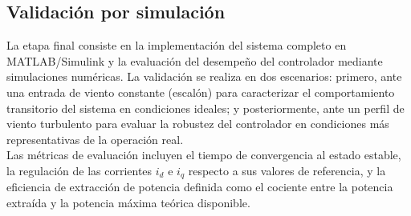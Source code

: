 \subsection{Validación por simulación}

La etapa final consiste en la implementación del sistema completo en 
MATLAB/Simulink y la evaluación del desempeño del controlador mediante 
simulaciones numéricas. La validación se realiza en dos escenarios: 
primero, ante una entrada de viento constante (escalón) para caracterizar 
el comportamiento transitorio del sistema en condiciones ideales; y 
posteriormente, ante un perfil de viento turbulento para evaluar la 
robustez del controlador en condiciones más representativas de la operación 
real.
\\

Las métricas de evaluación incluyen el tiempo de convergencia al estado 
estable, la regulación de las corrientes $i_d$ e $i_q$ respecto a sus 
valores de referencia, y la eficiencia de extracción de potencia definida 
como el cociente entre la potencia extraída y la potencia máxima teórica 
disponible.